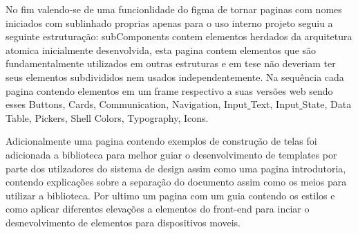   No fim valendo-se de uma funcionlidade do figma de tornar paginas com nomes iniciados com sublinhado proprias apenas para o uso interno projeto seguiu a seguinte estruturação: \underline{ }subComponents contem elementos herdados da arquitetura atomica inicialmente desenvolvida, esta pagina contem elementos que são fundamentalmente utilizados em outras estruturas e em tese não deveriam ter seus elementos subdivididos nem usados independentemente. Na sequência cada pagina contendo elementos em um frame respectivo a suas versões web sendo esses Buttons, Cards, Communication, Navigation, Input\underline{ }Text, Input\underline{ }State, Data\underline{ }Table, Pickers, Shell Colors, Typography, Icons.

  Adicionalmente uma pagina contendo exemplos de construção de telas foi adicionada a biblioteca para melhor guiar o desenvolvimento de templates por parte dos utilzadores do sistema de design assim como uma pagina introdutoria, contendo explicações sobre a separação do documento assim como os meios para utilizar a biblioteca. Por ultimo um pagina com um guia contendo os estilos e como aplicar diferentes elevações a elementos do front-end para inciar o desnevolvimento de elementos para dispositivos moveis.


  